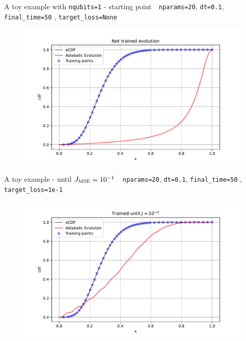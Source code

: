 \documentclass[8pt, xcolor={svgnames}, hyperref={colorlinks, linkcolor=black, citecolor=amethyst, urlcolor=amethyst}]{beamer}
\begin{document}
\begin{frame}[fragile]{A toy example with \texttt{nqubits=1} - starting point}
\large
\faArrowCircleRight\,\, \texttt{nparams=20}, \texttt{dt=0.1}, \texttt{final\_time=50}
, \texttt{target\_loss=None}
\begin{figure}
    \includegraphics[width=1\textwidth]{figures/ev0.pdf}
\end{figure}
\end{frame}

\begin{frame}[fragile]{A toy example - until $J_{\rm MSE}=10^{-1}$}
\large
\faArrowCircleRight\,\, \texttt{nparams=20}, \texttt{dt=0.1}, \texttt{final\_time=50}
, \texttt{target\_loss=1e-1}
\begin{figure}
    \includegraphics[width=1\textwidth]{figures/ev1.pdf}
\end{figure}
\end{frame}
\end{document}
